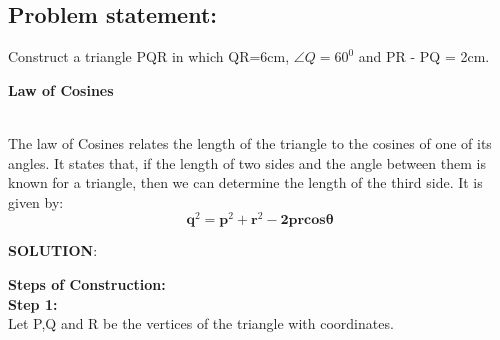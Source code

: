 \documentclass[10pt,a4paper]{article}
\let\vec\mathbf
\begin{document}
\begin{multicols}{2}
\section{Problem statement:}  Construct a triangle PQR in which QR=6cm, $\angle{Q}=60^0$ and PR - PQ = 2cm.\vspace{3mm}


\textbf{Law of Cosines}
\vspace{2mm}\raggedright \\

The law of Cosines relates the length of the triangle to the cosines of one of its angles. It states that, if the length of two sides and the angle between them is known for a triangle, then we can determine the length of the third side. It is given by:
\begin{equation}
	\vec{q}^2=\vec{p}^2+\vec{r}^2-
\vec{2prcos \theta} 
 \end{equation}

\raggedright \textbf{SOLUTION}:\vspace{5mm}\\
\raggedright \textbf{Steps of Construction:}\vspace{2mm}\\
\textbf{Step 1:}\vspace{2mm}\\
Let P,Q and R be the vertices of the triangle  with coordinates.


\end{multicols}
\end{document}
